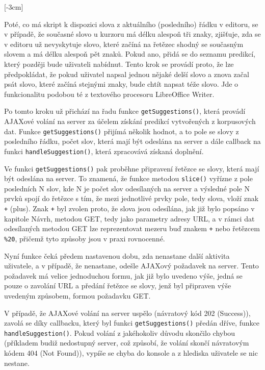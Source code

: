 \documentclass{article}
\begin{document}
[-3cm]

Poté, co má skript k dispozici slova z aktuálního (posledního) řádku v editoru, se v případě, že současné slovo u kurzoru má délku alespoň tři znaky, zjišťuje, zda se v editoru už nevyskytuje slovo, které začíná na řetězec shodný se současným slovem a má délku alespoň pět znaků. Pokud ano, přidá se do seznamu predikcí, který později bude uživateli nabídnut. Tento krok se provádí proto, že lze předpokládat, že pokud uživatel napsal jednou nějaké delší slovo a znova začal psát slovo, které začíná stejnými znaky, bude chtít napsat téže slovo. Jde o funkcionalitu podobou té z textového procesoru LibreOffice Writer.

Po tomto kroku už přichází na řadu funkce {\tt getSuggestions()}, která provádí AJAXové volání na server za účelem získání predikcí vytvořených z korpusových dat. Funkce {\tt getSuggestions()} přijímá několik hodnot, a to pole se slovy z posledního řádku, počet slov, která mají být odeslána na server a dále callback na funkci {\tt handleSuggestion()}, která zpracovává získaná doplnění.

Ve funkci {\tt getSuggestions()} pak proběhne připravení řetězce se slovy, která mají být odeslána na server. To znamená, že funkce metodou {\tt slice()} vyřízne z pole posledních N slov, kde N je počet slov odesílaných na server a výsledné pole N prvků spojí do řetězce s tím, že mezi jednotlivé prvky pole, tedy slova, vloží znak {\tt +} (plus). Znak {\tt +} byl zvolen proto, že slova jsou odesílána, jak již bylo popsáno v kapitole Návrh, metodou GET, tedy jako parametry adresy URL, a v rámci dat odesílaných metodou GET lze reprezentovat mezeru buď znakem {\tt +} nebo řetězcem {\tt \%20}, přičemž tyto způsoby jsou v praxi rovnocenné.

Nyní funkce čeká předem nastavenou dobu, zda nenastane další aktivita uživatele, a v případě, že nenastane, odešle AJAXový požadavek na server. Tento požadavek má velice jednoduchou formu, jak již bylo uvedeno výše, jedná se pouze o zavolání URL a předání řetězce se slovy, jenž byl připraven výše uvedeným způsobem, formou požadavku GET.

V případě, že AJAXové volání na server uspělo (návratový kód 202 (Success)), zavolá se díky callbacku, který byl funkci {\tt getSuggestions()} předán dříve, funkce {\tt handleSuggestion()}. Pokud volání z jakéhokoliv důvodu skončilo chybou (příkladem budiž nedostupný server, což způsobí, že volání skončí návratovým kódem 404 (Not Found)), vypíše se chyba do konsole a z hlediska uživatele se nic nestane. 
\end{document}
